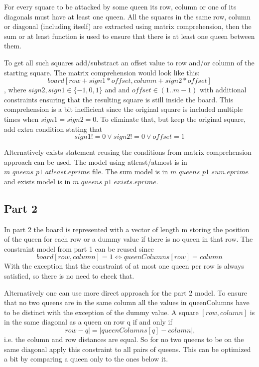 \documentclass{article}
\begin{document}
For every square to be attacked by some queen its row, column or one of its diagonals must have at least one queen. All the squares in the same row, column or diagonal (including itself) are extracted using matrix comprehension, then the sum or at least function is used to ensure that there is at least one queen between them.

To get all such squares add/substract an offset value to row and/or column of the starting square. The matrix comprehension would look like this:
\begin{equation}board[row + sign1*offset, column + sign2*offset]\end{equation},
where $sign2 ,sign1 \in \{-1,0,1\}$ and  and $offset\in(1..m-1)$ with additional constraints ensuring that the resulting square is still inside the board. This comprehension is a bit inefficient since the original square is included multiple times when $sign1 = sign2 = 0$. To eliminate that, but keep the original square,
 add extra condition stating that
\begin{equation}sign1 != 0 \lor sign2 != 0 \lor offset = 1\end{equation}

Alternatively exists statement reusing the conditions from matrix comprehension approach can be used. The model using atleast/atmost is in $m\_queens\_p1\_atleast.eprime$ file. The sum model is in \newline $m\_queens\_p1\_sum.eprime$ and exists model is in  $m\_queens\_p1\_exists.eprime$.

\subsection{Part 2}

In part 2 the board is represented with a vector of length m storing the position of the queen for each row or a dummy value if there is no queen in that row. The constraint model from part 1 can be reused since \begin{equation}
board[row, column] = 1 \Leftrightarrow queenColumns[row] = column\end{equation}
With the exception that the constraint of at most one queen per row is always satisfied, so there is no need to check that.

Alternatively one can use more direct approach for the part 2 model. To ensure that no two queens are in the same column all the values in queenColumns have to be distinct with the exception of the dummy value. A square $[row, column]$ is in the same diagonal as a queen on row q if and only if \begin{equation}|row - q| = |queenColumns[q] - column|,\end{equation} i.e. the column and row distances are equal. So for no two queens to be on the same diagonal apply this constraint to all pairs of queens. This can be optimized a bit by comparing a queen only to the ones below it.
\end{document}
